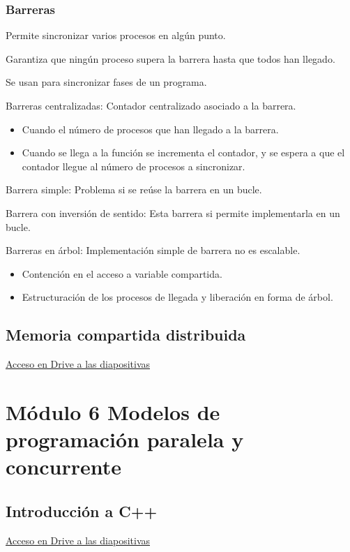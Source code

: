 \documentclass[12pt, twoside, openright]{report} %
\begin{document}
    \subsection{Barreras}

Permite sincronizar varios procesos en algún punto.


    Garantiza que ningún proceso supera la barrera hasta que todos han
    llegado.

    Se usan para sincronizar fases de un programa.
\pagebreak

    Barreras centralizadas: Contador centralizado asociado a la
    barrera.

    \begin{itemize}
    
    \item
      Cuando el número de procesos que han llegado a la barrera.
    \item
      Cuando se llega a la función se incrementa el contador, y se
      espera a que el contador llegue al número de procesos a
      sincronizar.
    \end{itemize}

    Barrera simple: Problema si se reúse la barrera en un bucle.

    Barrera con inversión de sentido: Esta barrera si permite
    implementarla en un bucle.

    Barreras en árbol: Implementación simple de barrera no es
    escalable.

    \begin{itemize}
    
    \item
      Contención en el acceso a variable compartida.
    \item
      Estructuración de los procesos de llegada y liberación en forma
      de árbol.
    \end{itemize}

\section{Memoria compartida distribuida}
\href{https://drive.google.com/file/d/1AWL1dUJmXv9hWbRNhzXvDSwOfp3kdKvT}{Acceso en Drive a las diapositivas}

\chapter{Módulo 6 Modelos de programación paralela y concurrente}
\section{Introducción a C++}
\href{https://drive.google.com/file/d/16WyicNTcyCuIs7skhuuINuadUm4pd0zB}{Acceso en Drive a las diapositivas}
\end{document}
